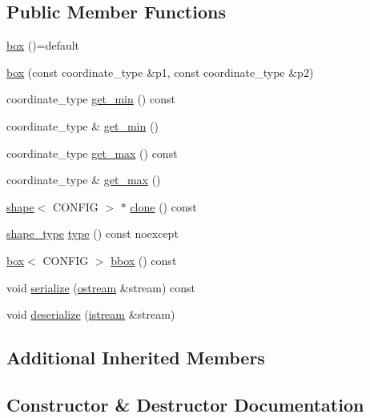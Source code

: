 \subsection*{Public Member Functions}
\begin{DoxyCompactItemize}
\item 
\hyperlink{classmui_1_1geometry_1_1box_af95308237e008507cef0400b80539256}{box} ()=default
\item 
\hyperlink{classmui_1_1geometry_1_1box_a4b31077f538bd68d1120d4f1a458cd86}{box} (const coordinate\+\_\+type \&p1, const coordinate\+\_\+type \&p2)
\item 
coordinate\+\_\+type \hyperlink{classmui_1_1geometry_1_1box_a548b6ae064a454c01d23052105bd62f4}{get\+\_\+min} () const
\item 
coordinate\+\_\+type \& \hyperlink{classmui_1_1geometry_1_1box_a8bbabc54ec2b2d7491d8aff412431f40}{get\+\_\+min} ()
\item 
coordinate\+\_\+type \hyperlink{classmui_1_1geometry_1_1box_aac50a654e0e82789ba447ac9d360959d}{get\+\_\+max} () const
\item 
coordinate\+\_\+type \& \hyperlink{classmui_1_1geometry_1_1box_a421cca9434b9ae8dc7ed0bb7b2fed411}{get\+\_\+max} ()
\item 
\hyperlink{classmui_1_1geometry_1_1shape}{shape}$<$ C\+O\+N\+F\+IG $>$ $\ast$ \hyperlink{classmui_1_1geometry_1_1box_aa7422049fe305395107f9cfd04c804bf}{clone} () const
\item 
\hyperlink{namespacemui_1_1geometry_a5f311a343181e2f20482e5c9afb0f136}{shape\+\_\+type} \hyperlink{classmui_1_1geometry_1_1box_a88a57a405777e8f34e632030d725f7be}{type} () const noexcept
\item 
\hyperlink{classmui_1_1geometry_1_1box}{box}$<$ C\+O\+N\+F\+IG $>$ \hyperlink{classmui_1_1geometry_1_1box_a900ea59f5e2745d18664690dc52c642b}{bbox} () const
\item 
void \hyperlink{classmui_1_1geometry_1_1box_aea666920fb81b48c7561df7d7da8a0d6}{serialize} (\hyperlink{classmui_1_1ostream}{ostream} \&stream) const
\item 
void \hyperlink{classmui_1_1geometry_1_1box_a35467a9cfe92d36b2b232b796f7959e7}{deserialize} (\hyperlink{classmui_1_1istream}{istream} \&stream)
\end{DoxyCompactItemize}
\subsection*{Additional Inherited Members}


\subsection{Constructor \& Destructor Documentation}
\mbox{\label{classmui_1_1geometry_1_1box_af95308237e008507cef0400b80539256}} 
